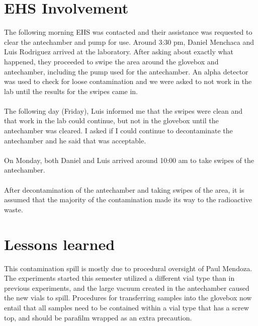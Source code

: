 \documentclass[11pt,notitlepage]{article}
\begin{document}

\section{EHS Involvement}

The following morning EHS was contacted and their assistance
was requested to clear the antechamber and pump for use.
Around 3:30 pm, Daniel Menchaca and Luis Rodriguez
arrived at the laboratory. After asking about exactly
what happened, they proceeded to swipe the area
around the glovebox and antechamber, including
the pump used for the antechamber. An alpha detector
was used to check for loose contamination and we were
asked to not work in the lab until the results for the swipes came in.
\\~\\
The following day (Friday), Luis informed me that the swipes were clean
and that work in the lab could continue, but not in the
glovebox until the antechamber was cleared. I asked if
I could continue to decontaminate the antechamber and he said that
was acceptable. 
\\~\\
On Monday, both Daniel and Luis arrived around 10:00 am to take
swipes of the antechamber. 
\\~\\
After decontamination of the antechamber and taking swipes
of the area, it is assumed that the majority of the contamination
made its way to the radioactive waste.


\section{Lessons learned}

This contamination spill is mostly due to procedural oversight
of Paul Mendoza. The experiments started this semester utilized
a different vial type than in previous experiments, and the
large vacuum created in the antechamber caused the new vials
to spill. Procedures for transferring samples into the glovebox
now entail that all samples need to be contained within a
vial type that has a screw top, and should be parafilm wrapped
as an extra precaution. 
\end{document}
